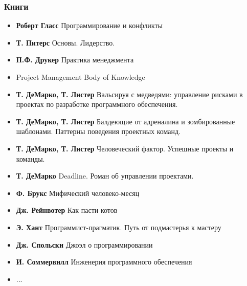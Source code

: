 \documentclass{../../slides-style}
\begin{document}
    \begin{frame}
        \frametitle{Книги}
        \begin{footnotesize}
            \begin{itemize}
                \item \textbf{Роберт Гласс} Программирование и конфликты
                \item \textbf{Т. Питерс} Основы. Лидерство.
                \item \textbf{П.Ф. Друкер} Практика менеджмента
                \item Project Management Body of Knowledge
                \item \textbf{Т. ДеМарко, Т. Листер} Вальсируя с медведями: управление рисками в проектах по разработке программного обеспечения.
                \item \textbf{Т. ДеМарко, Т. Листер} Балдеющие от адреналина и зомбированные шаблонами. Паттерны поведения проектных команд.
                \item \textbf{Т. ДеМарко, Т. Листер} Человеческий фактор. Успешные проекты и команды.
                \item \textbf{Т. ДеМарко} Deadline. Роман об управлении проектами.
                \item \textbf{Ф. Брукс} Мифический человеко-месяц
                \item \textbf{Дж. Рейнвотер} Как пасти котов
                \item \textbf{Э. Хант} Программист-прагматик. Путь от подмастерья к мастеру
                \item \textbf{Дж. Спольски} Джоэл о программировании
                \item \textbf{И. Соммервилл} Инженерия программного обеспечения
                \item ...
            \end{itemize}
        \end{footnotesize}
    \end{frame}
\end{document}

